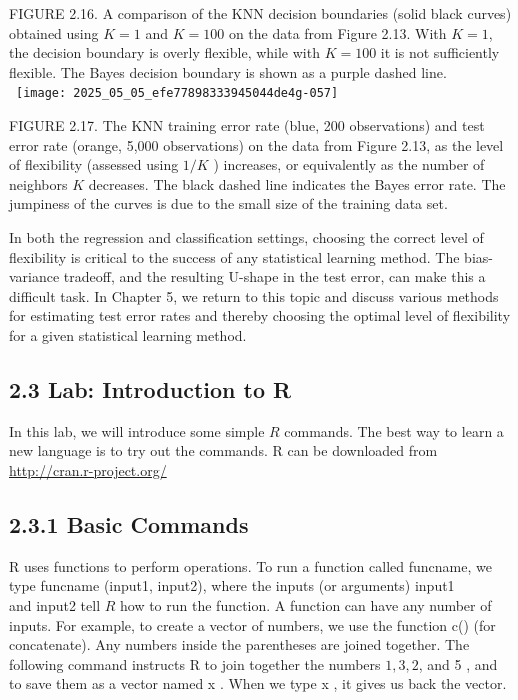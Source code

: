 \documentclass[10pt]{article}
\begin{document}
FIGURE 2.16. A comparison of the KNN decision boundaries (solid black curves) obtained using $K=1$ and $K=100$ on the data from Figure 2.13. With $K=1$, the decision boundary is overly flexible, while with $K=100$ it is not sufficiently flexible. The Bayes decision boundary is shown as a purple dashed line.\
\
\texttt{[image: 2025\_05\_05\_efe77898333945044de4g-057]}

FIGURE 2.17. The KNN training error rate (blue, 200 observations) and test error rate (orange, 5,000 observations) on the data from Figure 2.13, as the level of flexibility (assessed using $1 / K$ ) increases, or equivalently as the number of neighbors $K$ decreases. The black dashed line indicates the Bayes error rate. The jumpiness of the curves is due to the small size of the training data set.

In both the regression and classification settings, choosing the correct level of flexibility is critical to the success of any statistical learning method. The bias-variance tradeoff, and the resulting U-shape in the test error, can make this a difficult task. In Chapter 5, we return to this topic and discuss various methods for estimating test error rates and thereby choosing the optimal level of flexibility for a given statistical learning method.

\subsection*{2.3 Lab: Introduction to R}
In this lab, we will introduce some simple $R$ commands. The best way to learn a new language is to try out the commands. R can be downloaded from\\
\href{http://cran.r-project.org/}{http://cran.r-project.org/}

\subsection*{2.3.1 Basic Commands}
R uses functions to perform operations. To run a function called funcname, we type funcname (input1, input2), where the inputs (or arguments) input1\\
and input2 tell $R$ how to run the function. A function can have any number of inputs. For example, to create a vector of numbers, we use the function c() (for concatenate). Any numbers inside the parentheses are joined together. The following command instructs R to join together the numbers $1,3,2$, and 5 , and to save them as a vector named x . When we type x , it gives us back the vector.
\end{document}
